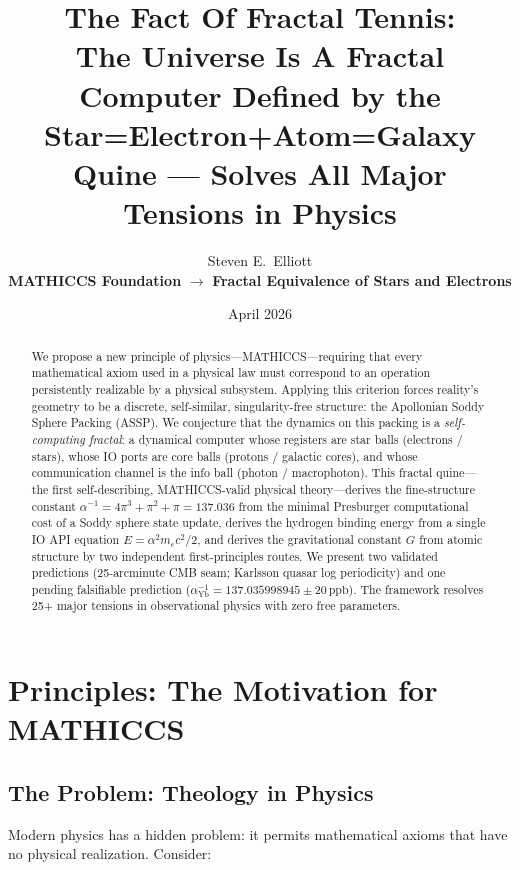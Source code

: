 \documentclass[11pt,a4paper]{article}
\title{The Fact Of Fractal Tennis: \\
The Universe Is A Fractal Computer Defined by the \\
Star=Electron+Atom=Galaxy Quine --- Solves All Major Tensions in Physics}
\author{Steven E.\ Elliott \\
\textbf{MATHICCS Foundation} $\to$
\textbf{Fractal Equivalence of Stars and Electrons}}
\date{April 2026}
\begin{document}
\maketitle

\begin{abstract}
We propose a new principle of physics---MATHICCS---requiring that every mathematical
axiom used in a physical law must correspond to an operation persistently realizable
by a physical subsystem. Applying this criterion forces reality's geometry to be a
discrete, self-similar, singularity-free structure: the Apollonian Soddy Sphere Packing
(ASSP). We conjecture that the dynamics on this packing is a \emph{self-computing
fractal}: a dynamical computer whose registers are star balls (electrons / stars),
whose IO ports are core balls (protons / galactic cores), and whose communication
channel is the info ball (photon / macrophoton). This fractal quine---the first
self-describing, MATHICCS-valid physical theory---derives the fine-structure constant
$\alpha^{-1} = 4\pi^3+\pi^2+\pi = 137.036$ from the minimal Presburger computational
cost of a Soddy sphere state update, derives the hydrogen binding energy from a single
IO API equation $E = \alpha^2 m_e c^2/2$, and derives the gravitational constant $G$
from atomic structure by two independent first-principles routes. We present two
validated predictions (25-arcminute CMB seam; Karlsson quasar log periodicity) and
one pending falsifiable prediction ($\alpha^{-1}_{\mathrm{Yb}} = 137.035998945 \pm
20\,\mathrm{ppb}$). The framework resolves 25+ major tensions in observational physics
with zero free parameters.
\end{abstract}


\section{Principles: The Motivation for MATHICCS}

\subsection{The Problem: Theology in Physics}

Modern physics has a hidden problem: it permits mathematical axioms that have no
physical realization. Consider:
\end{document}
